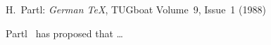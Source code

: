 \documentclass{article}
\begin{document}
\begin{thebibliography}{99}
 H.~Partl:
\emph{German \TeX},
TUGboat Volume~9, Issue~1 (1988)
\end{thebibliography}

Partl~\cite{pa} has
proposed that \ldots
\end{document}
